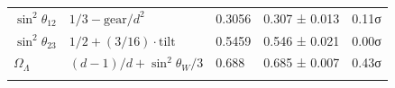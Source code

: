 \begin{longtable}[]{@{}lllll@{}}
\begin{minipage}[t]{0.13\columnwidth}\raggedright
\(\sin^2\theta_{12}\)\strut
\end{minipage} & \begin{minipage}[t]{0.25\columnwidth}\raggedright
\(1/3 - \text{gear}/d^2\)\strut
\end{minipage} & \begin{minipage}[t]{0.20\columnwidth}\raggedright
0.3056\strut
\end{minipage} & \begin{minipage}[t]{0.21\columnwidth}\raggedright
0.307 ± 0.013\strut
\end{minipage} & \begin{minipage}[t]{0.07\columnwidth}\raggedright
0.11σ\strut
\end{minipage}\tabularnewline
\begin{minipage}[t]{0.13\columnwidth}\raggedright
\(\sin^2\theta_{23}\)\strut
\end{minipage} & \begin{minipage}[t]{0.25\columnwidth}\raggedright
\(1/2 + (3/16)\cdot\text{tilt}\)\strut
\end{minipage} & \begin{minipage}[t]{0.20\columnwidth}\raggedright
0.5459\strut
\end{minipage} & \begin{minipage}[t]{0.21\columnwidth}\raggedright
0.546 ± 0.021\strut
\end{minipage} & \begin{minipage}[t]{0.07\columnwidth}\raggedright
0.00σ\strut
\end{minipage}\tabularnewline
\begin{minipage}[t]{0.13\columnwidth}\raggedright
\(\Omega_\Lambda\)\strut
\end{minipage} & \begin{minipage}[t]{0.25\columnwidth}\raggedright
\((d-1)/d + \sin^2\theta_W/3\)\strut
\end{minipage} & \begin{minipage}[t]{0.20\columnwidth}\raggedright
0.688\strut
\end{minipage} & \begin{minipage}[t]{0.21\columnwidth}\raggedright
0.685 ± 0.007\strut
\end{minipage} & \begin{minipage}[t]{0.07\columnwidth}\raggedright
0.43σ\strut
\end{minipage}\tabularnewline
\begin{minipage}[t]{0.13\columnwidth}\raggedright

\end{minipage}
\end{longtable}

